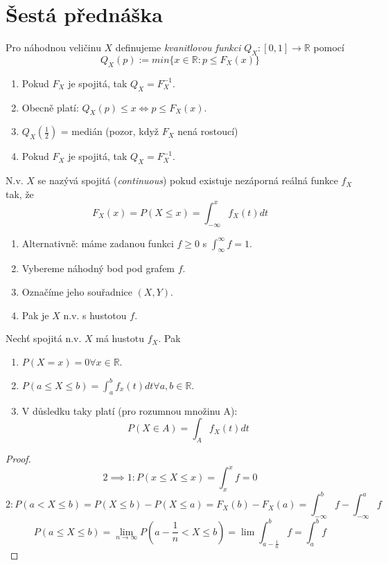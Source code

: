 \documentclass[../main.tex]{subfiles}
\begin{document}
\section{Šestá přednáška}

\begin{definition}
    Pro náhodnou veličinu $X$ definujeme \textit{kvanitlovou funkci} 
    $Q_X : [0,1] \rightarrow \mathbb{R}$ pomocí
    \[Q_X(p) := min \{x \in \mathbb{R} : p \leq F_X(x)\}\]
    \begin{enumerate}
        \item Pokud $F_X$ je spojitá, tak $Q_X = F^{-1}_X.$
        \item Obecně platí: $Q_X(p) \leq x \Leftrightarrow p \leq F_X(x)$.
        \item $Q_X(\frac{1}{2})$ = medián (pozor, když  $F_X$ nená rostoucí)
        \item Pokud $F_X$ je spojitá, tak $Q_X = F^{-1}_X$.
    \end{enumerate}
\end{definition}

\begin{definition}
    N.v. $X$ se nazývá spojitá (\textit{continuous}) pokud existuje nezáporná reálná funkce $f_X$ tak, že
    \[F_X(x) = P(X \leq x) = \int^x_{-\infty} f_X(t)dt\]
    \begin{enumerate}
        \item Alternativně: máme zadanou funkci $f \geq 0$ s $\int^\infty_\infty f = 1$.
        \item Vybereme náhodný bod pod grafem $f$.
        \item Označíme jeho souřadnice $(X,Y)$.
        \item Pak je $X$ n.v. s hustotou $f$.
    \end{enumerate}
\end{definition}

\begin{theorem}
    Nechť spojitá n.v. $X$ má hustotu $f_X$. Pak
    \begin{enumerate}
        \item $P(X=x) = 0 \forall x \in \mathbb{R}$.
        \item $P(a\leq X \leq b) = \int^b_a f_x(t) dt \forall a,b \in \mathbb{R}$.
        \item V důsledku taky platí (pro rozumnou množinu A):
            \[P(X\in A) = \int_A f_X(t) dt\]
    \end{enumerate} 
\end{theorem}
\begin{proof}
    \[2 \implies 1 : P(x\leq X\leq x) = \int^x_x f = 0\]
    \[2 :  P(a < X \leq b) = P(X\leq b) - P(X\leq a) = F_X(b) - F_X(a) = \int^b_{-\infty} f - \int^a_{-\infty} f\]
    \[P(a\leq X \leq b) = \lim_{n\rightarrow \infty} P(a-\frac{1}{n} < X \leq b) = \lim \int^b_{a-\frac{1}{n}} f = \int^b_a f\]
\end{proof}
\end{document}
